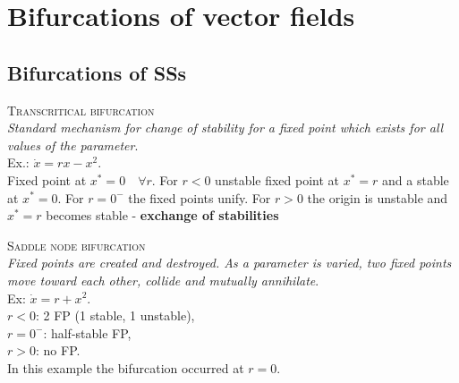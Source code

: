 \section{Bifurcations of vector fields}
\subsection{Bifurcations of SSs}
\textsc{Transcritical bifurcation}\\
\emph{Standard mechanism for change of stability for a fixed point which exists for all values of the parameter}.\\
Ex.: $\dot{x}=rx-x^2$.\\
Fixed point at $x^*=0 \quad \forall r$. For $r<0$ unstable fixed point at $x^*=r$ and a stable at $x^*=0$. For $r=0^-$ the fixed points unify. For $r>0$ the origin is unstable and $x^*=r$ becomes stable - \textbf{exchange of stabilities}
\begin{center}
\end{center}
\vspace{0.2cm}


\textsc{Saddle node bifurcation}\\
\emph{Fixed points are created and destroyed. As a parameter is varied, two fixed points move toward each other, collide and mutually annihilate}.\\
Ex: $\dot{x}=r+x^2$.\\ $r<0$: 2 FP (1 stable, 1 unstable),\\ $r=0^-$: half-stable FP, \\ $r>0$: no FP.\\ In this example the bifurcation occurred at $r=0$.
\begin{center}
\end{center}
\vspace{0.2cm}

